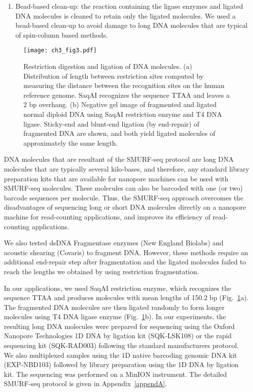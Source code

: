 \begin{enumerate}
\item Bead-based clean-up: the reaction containing the ligase enzymes and
  ligated DNA molecules is cleaned to retain only the ligated molecules. We
  used a bead-based clean-up to avoid damage to long DNA
  molecules that are typical of spin-column based methods.
\end{enumerate}

\begin{figure}[t!]
\centering
\texttt{[image: ch3\_fig3.pdf]}
\caption[Restriction digestion and ligation of DNA molecules.]{
  Restriction digestion and ligation of DNA molecules.
  (a) Distribution of length between restriction sites computed
  by measuring the distance between the recognition sites on the human
  reference genome. SaqAI recognizes the sequence TTAA and leaves a 2 bp
  overhang.
  (b) Negative gel image of fragmented and ligated normal diploid DNA
  using SaqAI restriction enzyme and T4 DNA ligase.  Sticky-end and
  blunt-end ligation (by end-repair) of fragmented DNA are shown, and
  both yield ligated molecules of approximately the same length.}
\label{re_frag}
\end{figure}

DNA molecules that are resultant of the SMURF-seq protocol are long DNA
molecules that are typically several kilo-bases, and therefore, any
standard library preparation kits that are available for nanopore
machines can be used with SMURF-seq molecules. These molecules can also
be barcoded with one (or two) barcode sequences per molecule. Thus, the
SMURF-seq approach overcomes the disadvantages of sequencing long or
short DNA molecules directly on a nanopore machine for read-counting
applications, and improves its efficiency of read-counting
applications.

We also tested dsDNA Fragmentase enzymes (New England Biolabs) and
acoustic shearing (Covaris) to fragment DNA. However, these methods
require an additional end-repair step after fragmentation and the
ligated molecules failed to reach the lengths we obtained by using
restriction fragmentation.

In our applications, we used SaqAI restriction enzyme, which recognizes
the sequence TTAA and produces molecules with mean lengths of 150.2 bp
(Fig.~\ref{re_frag}a).
The fragmented DNA molecules are then ligated randomly to form longer
molecules using T4 DNA ligase enzyme (Fig.~\ref{re_frag}b).
%
In our experiments, the resulting long DNA molecules were prepared for
sequencing
using the Oxford Nanopore Technologies 1D DNA by ligation kit
(SQK-LSK108) or the rapid sequencing kit (SQK-RAD003) following the
standard manufacturers protocol. We also multiplexed samples using the
1D native barcoding genomic DNA kit (EXP-NBD103) followed by library
preparation using the 1D DNA by ligation kit. The sequencing was
performed on a MinION instrument.
%
The detailed SMURF-seq protocol is given in Appendix~\ref{appendA}.



